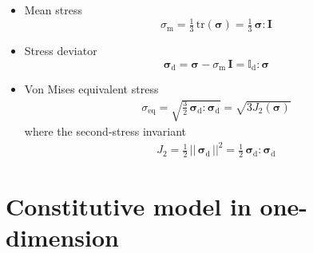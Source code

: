 \documentclass[times,namecite]{goose-article}
\begin{document}
\begin{itemize}
%
\item Mean stress
%
\begin{equation}
\sigma_\mathrm{m}
= \tfrac{1}{3} \, \mathrm{tr} ( \bm{\sigma} )
= \tfrac{1}{3} \, \bm{\sigma} : \bm{I}
\end{equation}
%
\item Stress deviator
%
\begin{equation}
  \bm{\sigma}_\mathrm{d}
  = \bm{\sigma} - \sigma_\mathrm{m} \, \bm{I}
  = \mathbb{I}_\mathrm{d} : \bm{\sigma}
\end{equation}
%
\item Von Mises equivalent stress
\begin{align}
\sigma_\mathrm{eq}
= \sqrt{ \tfrac{3}{2} \, \bm{\sigma}_\mathrm{d} : \bm{\sigma}_\mathrm{d} }
= \sqrt{ 3 J_2(\bm{\sigma}) }
\end{align}
where the second-stress invariant
\begin{align}
J_2 = \tfrac{1}{2} \, || \, \bm{\sigma}_\mathrm{d} \, ||^2
    = \tfrac{1}{2} \, \bm{\sigma}_\mathrm{d} : \bm{\sigma}_\mathrm{d}
\end{align}
%
\end{itemize}

\section{Constitutive model in one-dimension}
\label{sec:1D}
\end{document}
